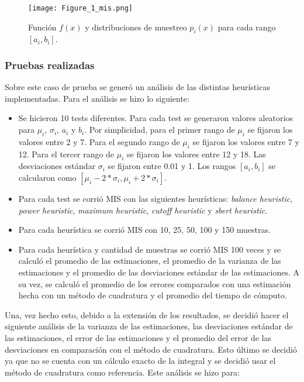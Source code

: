 \documentclass{article}
\begin{document}
\begin{figure}[H]
\texttt{[image: Figure\_1\_mis.png]}
\caption{Función \( f(x) \) y distribuciones de muestreo \( p_{i}(x) \) para cada rango \( [a_{i}, b_{i}] \).}
\label{fig:mis1}
\end{figure}

\subsubsection{Pruebas realizadas}

Sobre este caso de prueba se generó un análisis de las distintas heurísticas implementadas.
Para el análisis se hizo lo siguiente:
\begin{itemize}
    \item Se hicieron 10 tests diferentes. Para cada test se generaron valores aleatorios para \( \mu_{i} \), \( \sigma_{i} \), \( a_{i} \) y \( b_{i} \).
          Por simplicidad, para el primer rango de  \( \mu_{i} \) se fijaron los valores entre 2 y 7.
          Para el segundo rango de \( \mu_{i} \) se fijaron los valores entre 7 y 12.
          Para el tercer rango de \( \mu_{i} \) se fijaron los valores entre 12 y 18.
          Las desviaciones estándar \( \sigma_{i} \) se fijaron entre 0.01 y 1.
          Los rangos \( [a_{i}, b_{i}] \) se calcularon como \( [ \mu_{i} - 2 * \sigma_{i}, \mu_{i} + 2 * \sigma_{i} ] \).
    \item Para cada test se corrió MIS con las siguientes heurísticas: \textit{balance heuristic}, \textit{power heuristic}, \textit{maximum heuristic}, \textit{cutoff heuristic} y \textit{sbert heuristic}.
    \item Para cada heurística se corrió MIS con 10, 25, 50, 100 y 150 muestras.
    \item Para cada heurística y cantidad de muestras se corrió MIS 100 veces y se calculó el promedio de las estimaciones,
          el promedio de la varianza de las estimaciones y el promedio de las desviaciones estándar de las estimaciones.
          A su vez, se calculó el promedio de los errores comparados con una estimación hecha con un método de cuadratura y el promedio del tiempo de cómputo.
\end{itemize}

Una, vez hecho esto, debido a la extensión de los resultados, se decidió hacer el siguiente análisis de la varianza de las estimaciones, las desviaciones estándar de las estimaciones, el error de las estimaciones y el promedio del error de las desviaciones en comparación con el método de cuadratura.
Esto último se decidió ya que no se cuenta con un cálculo exacto de la integral y se decidió usar el método de cuadratura como referencia.
Este análisis se hizo para:
\end{document}
